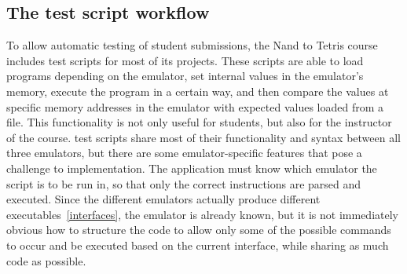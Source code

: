 \subsection{The test script workflow} \label{test-script-workflow}
To allow automatic testing of student submissions, the Nand to Tetris course includes test scripts for most of its projects. These scripts are able to load programs depending on the emulator, set internal values in the emulator's memory, execute the program in a certain way, and then compare the values at specific memory addresses in the emulator with expected values loaded from a file.
This functionality is not only useful for students, but also for the instructor of the course.
test scripts share most of their functionality and syntax between all three emulators, but there are some emulator-specific features that pose a challenge to implementation.
The application must know which emulator the script is to be run in, so that only the correct instructions are parsed and executed.
Since the different emulators actually produce different executables~\ref{interfaces}, the emulator is already known, but it is not immediately obvious how to structure the code to allow only some of the possible commands to occur and be executed based on the current interface, while sharing as much code as possible.

